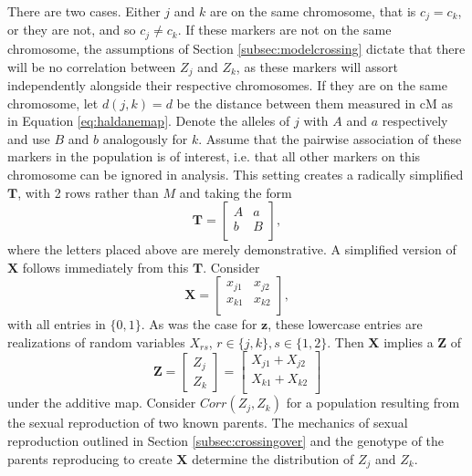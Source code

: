 \documentclass[12pt]{article}
\newcommand{\ve}[1]{\mathbf{#1}}           %
\newcommand{\m}[1]{\mathbf{#1}}               %
\begin{document}
There are two cases. Either $j$ and $k$ are on the same chromosome, that is $c_j = c_k$, or they are not, and so $c_j \neq c_k$. If these markers are not on the same chromosome, the assumptions of Section \ref{subsec:modelcrossing} dictate that there will be no correlation between $Z_j$ and $Z_k$, as these markers will assort independently alongside their respective chromosomes. If they are on the same chromosome, let $d(j,k) = d$ be the distance between them measured in cM as in Equation \ref{eq:haldanemap}. Denote the alleles of $j$ with $A$ and $a$ respectively and use $B$ and $b$ analogously for $k$. Assume that the pairwise association of these markers in the population is of interest, i.e. that all other markers on this chromosome can be ignored in analysis. This setting creates a radically simplified $\m{T}$, with 2 rows rather than $M$ and taking the form
$$\m{T} = \begin{bmatrix}
  A & a \\
  b & B \\
\end{bmatrix},$$
where the letters placed above are merely demonstrative. A simplified version of $\m{X}$ follows immediately from this $\m{T}$. Consider
$$\m{X} = \begin{bmatrix}
  x_{j1} & x_{j2} \\
  x_{k1} & x_{k2} \\
\end{bmatrix},$$
with all entries in $\{0,1\}$. As was the case for $\ve{z}$, these lowercase entries are realizations of random variables $X_{rs}$, $r \in \{j,k\}, s \in \{1,2\}$. Then $\m{X}$ implies a $\ve{Z}$ of
$$\ve{Z} = \begin{bmatrix} Z_j \\ Z_k \end{bmatrix} = \begin{bmatrix}
  X_{j1} + X_{j2} \\
  X_{k1} + X_{k2} \\
\end{bmatrix}$$
under the additive map. Consider $Corr(Z_j, Z_k)$ for a population resulting from the sexual reproduction of two known parents.
The mechanics of sexual reproduction outlined in Section \ref{subsec:crossingover} and the genotype of the parents reproducing to create $\m{X}$ determine the distribution of $Z_j$ and $Z_k$.
\end{document}
